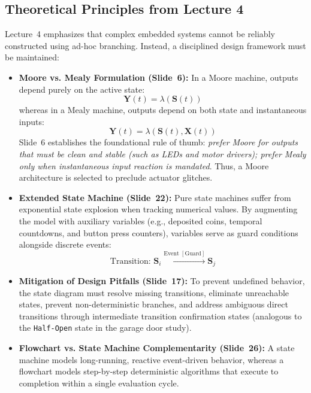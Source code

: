 \documentclass[12pt]{article}
\begin{document}
\subsection{Theoretical Principles from Lecture 4}
Lecture~4 emphasizes that complex embedded systems cannot be reliably constructed using ad-hoc branching. Instead, a disciplined design framework must be maintained:
\begin{itemize}
    \item \textbf{Moore vs. Mealy Formulation (Slide~6):} In a Moore machine, outputs depend purely on the active state:
    \begin{equation}
        \mathbf{Y}(t) = \lambda(\mathbf{S}(t))
    \end{equation}
    whereas in a Mealy machine, outputs depend on both state and instantaneous inputs:
    \begin{equation}
        \mathbf{Y}(t) = \lambda(\mathbf{S}(t), \mathbf{X}(t))
    \end{equation}
    Slide~6 establishes the foundational rule of thumb: \textit{prefer Moore for outputs that must be clean and stable (such as LEDs and motor drivers); prefer Mealy only when instantaneous input reaction is mandated}. Thus, a Moore architecture is selected to preclude actuator glitches.
    \item \textbf{Extended State Machine (Slide~22):} Pure state machines suffer from exponential state explosion when tracking numerical values. By augmenting the model with auxiliary variables (e.g., deposited coins, temporal countdowns, and button press counters), variables serve as guard conditions alongside discrete events:
    \begin{equation}
        \text{Transition: } \mathbf{S}_i \xrightarrow{\text{Event } [\text{Guard}]} \mathbf{S}_j
    \end{equation}
    \item \textbf{Mitigation of Design Pitfalls (Slide~17):} To prevent undefined behavior, the state diagram must resolve missing transitions, eliminate unreachable states, prevent non-deterministic branches, and address ambiguous direct transitions through intermediate transition confirmation states (analogous to the \texttt{Half-Open} state in the garage door study).
    \item \textbf{Flowchart vs. State Machine Complementarity (Slide~26):} A state machine models long-running, reactive event-driven behavior, whereas a flowchart models step-by-step deterministic algorithms that execute to completion within a single evaluation cycle.
\end{itemize}
\end{document}
